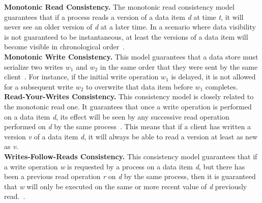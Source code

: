 \noindent \textbf{Monotonic Read Consistency.}
The monotonic read consistency model guarantees that if a process reads a version of a data item \textit{d} at time \textit{t}, it will never see an older version of \textit{d} at a later time. In a scenario where data visibility is not guaranteed to be instantaneous, at least the versions of a data item will become visible in chronological order~\cite{tanenbaum:2007,Vogels:2009}. \\

\noindent \textbf{Monotonic Write Consistency.}
This model guarantees that a data store must serialize two writes \textit{$w_{1}$} and \textit{$w_{2}$} in the same order that they were sent by the same client~\cite{tanenbaum:2007, Vogels:2009}. 
For instance, if the initial write operation \textit{$w_{1}$} is delayed, it is not allowed for a subsequent write \textit{$w_{2}$} to overwrite that data item before \textit{$w_{1}$} completes. \\

\noindent \textbf{Read-Your-Writes Consistency.}
This consistency model is closely related to the monotonic read one. It guarantees that once a write operation is performed on a data item \textit{d}, its effect will be seen by any successive read operation performed on \textit{d} by the same process~\cite{tanenbaum:2007, Vogels:2009}. This means that if a client has written a version \textit{v} of a data item \textit{d}, it will always be able to read a version at least as new as \textit{v}. \\

\noindent \textbf{Writes-Follow-Reads Consistency.} %
This consistency model guarantees that if a write operation \textit{w} is requested by a process on a data item \textit{d}, but there has been a previous read operation \textit{r} on \textit{d} by the same process, then it is guaranteed that \textit{w} will only be executed on the same or more recent value of \textit{d} previously  read.~\cite{tanenbaum:2007}. 

